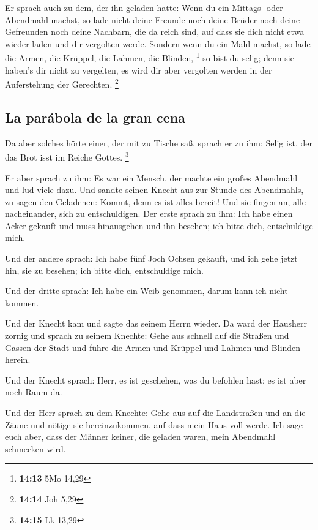 Er sprach auch zu dem, der ihn geladen hatte: Wenn du
ein Mittags- oder Abendmahl machst, so lade nicht deine Freunde noch
deine Brüder noch deine Gefreunden noch deine Nachbarn, die da reich
sind, auf dass sie dich nicht etwa wieder laden und dir vergolten werde.
 Sondern wenn du ein Mahl machst, so lade die Armen, die
Krüppel, die Lahmen, die Blinden, \footnote{\textbf{14:13} 5Mo 14,29}
 so bist du selig; denn sie haben's dir nicht zu
vergelten, es wird dir aber vergolten werden in der Auferstehung der
Gerechten. \footnote{\textbf{14:14} Joh 5,29}

\hypertarget{la-paruxe1bola-de-la-gran-cena}{%
\subsection{La parábola de la gran
cena}\label{la-paruxe1bola-de-la-gran-cena}}

 Da aber solches hörte einer, der mit zu Tische saß,
sprach er zu ihm: Selig ist, der das Brot isst im Reiche Gottes.
\footnote{\textbf{14:15} Lk 13,29}

 Er aber sprach zu ihm: Es war ein Mensch, der machte ein
großes Abendmahl und lud viele dazu.  Und sandte seinen
Knecht aus zur Stunde des Abendmahls, zu sagen den Geladenen: Kommt,
denn es ist alles bereit!  Und sie fingen an, alle
nacheinander, sich zu entschuldigen. Der erste sprach zu ihm: Ich habe
einen Acker gekauft und muss hinausgehen und ihn besehen; ich bitte
dich, entschuldige mich.

 Und der andere sprach: Ich habe fünf Joch Ochsen
gekauft, und ich gehe jetzt hin, sie zu besehen; ich bitte dich,
entschuldige mich.

 Und der dritte sprach: Ich habe ein Weib genommen, darum
kann ich nicht kommen.

 Und der Knecht kam und sagte das seinem Herrn wieder. Da
ward der Hausherr zornig und sprach zu seinem Knechte: Gehe aus schnell
auf die Straßen und Gassen der Stadt und führe die Armen und Krüppel und
Lahmen und Blinden herein.

 Und der Knecht sprach: Herr, es ist geschehen, was du
befohlen hast; es ist aber noch Raum da.

 Und der Herr sprach zu dem Knechte: Gehe aus auf die
Landstraßen und an die Zäune und nötige sie hereinzukommen, auf dass
mein Haus voll werde.  Ich sage euch aber, dass der
Männer keiner, die geladen waren, mein Abendmahl schmecken wird.

